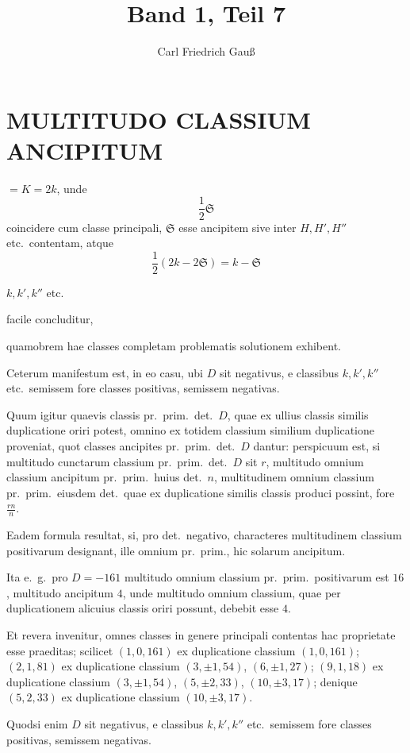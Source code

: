 \documentclass[12pt,a4paper]{article}
\title{Band 1, Teil 7}
\author{Carl Friedrich Gau\ss}
\date{}
\theoremstyle{plain}
\theoremstyle{definition}
\theoremstyle{remark}
\begin{document}
\maketitle
{}

\section*{MULTITUDO CLASSIUM ANCIPITUM}

$= K = 2k$, unde
\[\textstyle\frac{1}{2}\mathfrak{S}\]
coincidere cum classe principali, $\mathfrak{S}$ esse ancipitem sive inter $H, H', H''$ etc.\ contentam, atque
\[\textstyle\frac{1}{2}(2k-2\mathfrak{S}) = k-\mathfrak{S}\]

$k, k', k''$ etc.

facile concluditur,

quamobrem hae classes completam problematis solutionem exhibent.

Ceterum manifestum est, in eo casu, ubi $D$ sit negativus, e classibus $k, k', k''$ etc.\ semissem fore classes positivas, semissem negativas.

Quum igitur quaevis classis pr.\ prim.\ det.\ $D$, quae ex ullius classis similis duplicatione oriri potest, omnino ex totidem classium similium duplicatione proveniat, quot classes ancipites pr.\ prim.\ det.\ $D$ dantur: perspicuum est, si multitudo cunctarum classium pr.\ prim.\ det.\ $D$ sit $r$, multitudo omnium classium ancipitum pr.\ prim.\ huius det.\ $n$, multitudinem omnium classium pr.\ prim.\ eiusdem det.\ quae ex duplicatione similis classis produci possint, fore $\frac{rn}{n}$.

Eadem formula resultat, si, pro det.\ negativo, characteres multitudinem classium positivarum designant, ille omnium pr.\ prim., hic solarum ancipitum.

Ita e.\ g.\ pro $D = -161$ multitudo omnium classium pr.\ prim.\ positivarum est $16$, multitudo ancipitum $4$, unde multitudo omnium classium, quae per duplicationem alicuius classis oriri possunt, debebit esse $4$.

Et revera invenitur, omnes classes in genere principali contentas hac proprietate esse praeditas; scilicet $(1,0,161)$ ex duplicatione classium $(1,0,161)$; $(2,1,81)$ ex duplicatione classium $(3,\pm 1,54)$, $(6,\pm 1,27)$; $(9,1,18)$ ex duplicatione classium $(3,\pm 1,54)$, $(5,\pm 2,33)$, $(10,\pm 3,17)$; denique $(5,2,33)$ ex duplicatione classium $(10,\pm 3,17)$.

Quodsi enim $D$ sit negativus, e classibus $k, k', k''$ etc.\ semissem fore classes positivas, semissem negativas.
\end{document}
